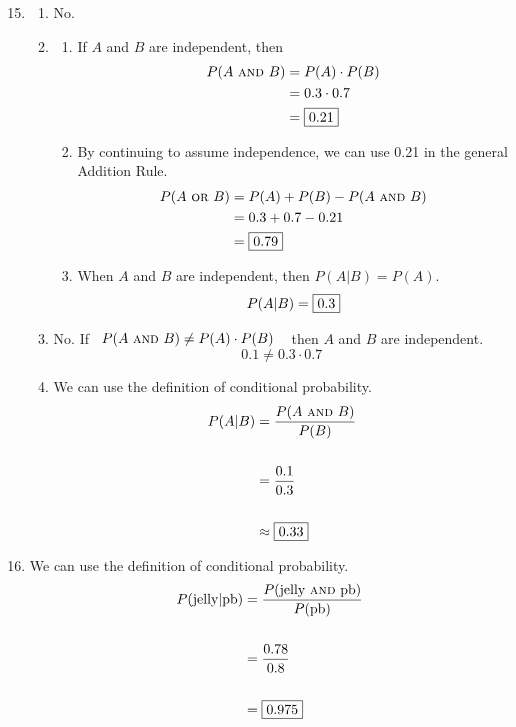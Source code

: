 \documentclass[12pt,letterpaper]{article}
\begin{document}
\newcommand{\AND}{~\textsc{and}~}
\newcommand{\OR}{~\textsc{or}~}

\begin{enumerate}
\setcounter{enumi}{14}
\item \begin{enumerate}
\item No.
\item \begin{enumerate}
	\item If $A$ and $B$ are independent, then 
	\begin{align*}
	P(A\AND B) &= P(A) \cdot P(B) \\
	&= 0.3 \cdot 0.7 \\
	&= \fbox{0.21} \\
	\end{align*}
	\item By continuing to assume independence, we can use 0.21 in the general Addition Rule.
	\begin{align*}
	P(A\OR B) &= P(A) + P(B) - P(A\AND B) \\
	&= 0.3 + 0.7 - 0.21 \\
	&= \fbox{0.79} \\
	\end{align*}
	\item When $A$ and $B$ are independent, then $P(A|B) = P(A)$. 
	$$P(A|B) = \fbox{0.3} $$
\end{enumerate}
\item No. If ~$P(A\AND B) \ne P(A) \cdot P(B)$ ~ then $A$ and $B$ are independent.
$$0.1 \ne 0.3 \cdot 0.7$$
\item We can use the definition of conditional probability.
\begin{align*}
P(A | B) &= \frac{P(A\AND B)}{P(B)} \\\\
&= \frac{0.1}{0.3} \\\\
&\approx \fbox{0.33} \\
\end{align*}
\end{enumerate}

\item We can use the definition of conditional probability.
\begin{align*}
P(\text{jelly}|\text{pb}) &= \frac{P(\text{jelly}\AND\text{pb})}{P(\text{pb})} \\\\
&= \frac{0.78}{0.8}\\\\
&= \fbox{0.975}
\end{align*}


\end{enumerate}
\end{document}
